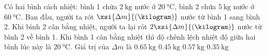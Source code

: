 \begin{ex}
	Có hai bình cách nhiệt: bình 1 chứa $\SI{2}{\kilogram}$ nước ở $\SI{20}{\celsius}$, bình 2 chứa $\SI{5}{\kilogram}$ nước ở $\SI{60}{\celsius}$. Ban đầu, người ta rót $\xsi{\Delta m}{\left(\kilogram\right)}$ nước từ bình 1 sang bình 2. Khi bình 2 cân bằng nhiệt, người ta lại rót $2\xsi{\Delta m}{\left(\kilogram\right)}$ nước từ bình 2 về bình 1. Khi bình 1 cân bằng nhiệt thì độ chênh lệch nhiệt độ giữa hai bình lúc này là $\SI{20}{\celsius}$. Giá trị của $\Delta m$ là
	\choice
	{$\SI{0.65}{\kilogram}$}
	{$\SI{0.45}{\kilogram}$}
	{\True $\SI{0.57}{\kilogram}$}
	{$\SI{0.35}{\kilogram}$}
\end{ex}
